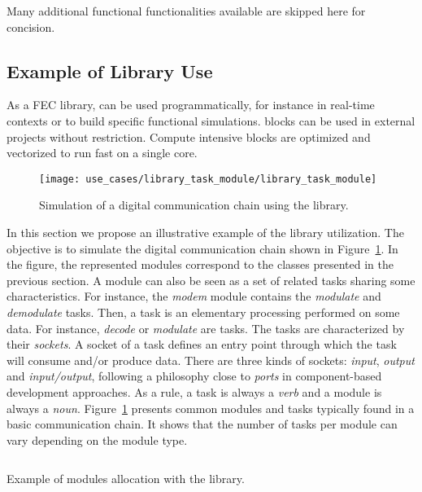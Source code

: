 Many additional functional functionalities available are skipped here for
concision.

\subsection{Example of Library Use}

As a FEC library, \AFFECT can be used programmatically, for instance in
real-time contexts or to build specific functional simulations. \AFFECT blocks
can be used in external projects without restriction. Compute intensive blocks
are optimized and vectorized to run fast on a single core.


\begin{figure}[htp]
  \centering
  \texttt{[image: use\_cases/library\_task\_module/library\_task\_module]}
  \caption{Simulation of a digital communication chain using the \AFFECT
    library.}
  \label{fig:aff3ct_library_task_module}
\end{figure}

In this section we propose an illustrative example of the \AFFECT library
utilization. The objective is to simulate the digital communication chain shown
in Figure~\ref{fig:aff3ct_library_task_module}. In the figure, the represented
modules correspond to the classes presented in the previous section. A module
can also be seen as a set of related tasks sharing some characteristics. For
instance, the \textit{modem} module contains the \textit{modulate} and
\textit{demodulate} tasks. Then, a task is an elementary processing performed on
some data. For instance, \textit{decode} or \textit{modulate} are tasks. The
tasks are characterized by their \textit{sockets}. A socket of a task defines an
entry point through which the task will consume and/or produce data. There are
three kinds of sockets: \textit{input}, \textit{output} and
\textit{input/output}, following a philosophy close to \emph{ports} in
component-based development approaches. As a rule, a task is always a
\emph{verb} and a module is always a \emph{noun}.
Figure~\ref{fig:aff3ct_library_task_module} presents common modules and tasks
typically found in a basic communication chain. It shows that the number of
tasks per module can vary depending on the module type.

\begin{listing}[htp]
  \inputminted[frame=lines,linenos]{C++}{main/chapter4/src/use_cases/library/modules_allocation.cpp}
  \caption{Example of modules allocation with the \AFFECT library.}
  \label{lst:aff3ct_library_modules_allocation}
\end{listing}

